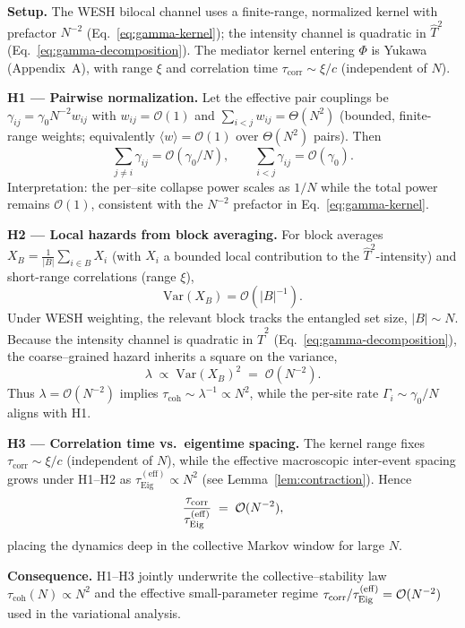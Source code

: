 \documentclass[12pt,a4paper]{article}
\newcommand{\corr}{\mathrm{corr}}
\newcommand{\coh}{\mathrm{coh}}
\numberwithin{equation}{section}
\begin{document}
\noindent\textbf{Setup.} The WESH bilocal channel uses a finite-range, normalized kernel with prefactor $N^{-2}$ (Eq.~\eqref{eq:gamma-kernel}); the intensity channel is quadratic in $\hat T^2$ (Eq.~\eqref{eq:gamma-decomposition}). The mediator kernel entering $\Phi$ is Yukawa (Appendix~A), with range $\xi$ and correlation time $\tau_{\corr}\sim \xi/c$ (independent of $N$).

\vspace{0.6em}
\noindent\textbf{H1 — Pairwise normalization.} Let the effective pair couplings be $\gamma_{ij}=\gamma_0 N^{-2} w_{ij}$ with $w_{ij}=\mathcal O(1)$ and $\sum_{i<j} w_{ij}=\Theta(N^2)$ (bounded, finite-range weights; equivalently $\langle w\rangle=\mathcal O(1)$ over $\Theta(N^2)$ pairs). Then
\[
\sum_{j\ne i}\gamma_{ij}=\mathcal O(\gamma_0/N),
\qquad
\sum_{i<j}\gamma_{ij}=\mathcal O(\gamma_0).
\]
Interpretation: the per–site collapse power scales as $1/N$ while the total power remains $\mathcal O(1)$, consistent with the $N^{-2}$ prefactor in Eq.~\eqref{eq:gamma-kernel}.

\vspace{0.6em}
\noindent\textbf{H2 — Local hazards from block averaging.} For block averages $X_B=\frac{1}{|B|}\sum_{i\in B}X_i$ (with $X_i$ a bounded local contribution to the $\hat T^2$-intensity) and short-range correlations (range $\xi$),
\[
\mathrm{Var}(X_B)=\mathcal O(|B|^{-1}).
\]
Under WESH weighting, the relevant block tracks the entangled set size, $|B|\sim N$. Because the intensity channel is quadratic in $\hat T^2$ (Eq.~\eqref{eq:gamma-decomposition}), the coarse–grained hazard inherits a square on the variance,
\[
\lambda \;\propto\; \mathrm{Var}(X_B)^2 \;=\; \mathcal O(N^{-2}).
\]
Thus $\lambda=\mathcal O(N^{-2})$ implies $\tau_{\mathrm{coh}}\sim\lambda^{-1}\propto N^2$, while the per-site rate $\Gamma_i\sim \gamma_0/N$ aligns with H1.

\vspace{0.6em}
\noindent\textbf{H3 — Correlation time vs.\ eigentime spacing.} The kernel range fixes $\tau_{\mathrm{corr}}\sim \xi/c$ (independent of $N$), while the effective macroscopic inter-event spacing grows under H1–H2 as $\tau_{\mathrm{Eig}}^{(\mathrm{eff})}\propto N^{2}$ (see Lemma~\ref{lem:contraction}). Hence
\[
\frac{\tau_{\corr}}{\tau_{\rm Eig}^{(\mathrm{eff})}} \;=\; \mathcal O(N^{-2}),
\]
placing the dynamics deep in the collective Markov window for large $N$.

\vspace{0.6em}
\noindent\textbf{Consequence.} H1–H3 jointly underwrite the collective–stability law $\tau_{\coh}(N)\propto N^{2}$ and the effective small-parameter regime $\tau_{\corr}/\tau_{\rm Eig}^{(\mathrm{eff})}=\mathcal O(N^{-2})$ used in the variational analysis.
\end{document}
